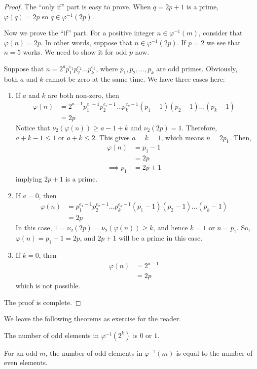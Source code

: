 	\begin{proof}
		The ``only if'' part is easy to prove. When $q=2p+1$ is a prime, $\varphi(q)=2p$ so $q\in\varphi^{-1}(2p)$.

		Now we prove the ``if'' part. For a positive integer $n\in\varphi^{-1}(m)$, consider that $\varphi(n)=2p$. In other words, suppose that $n \in\varphi^{-1}(2p)$.  If $p=2$ we see that $n=5$ works. We need to show it for odd $p$ now.

		Suppose that $n= 2^a p_1^{e_1}p_2^{e_2}\dots p_k^{e_k}$, where $p_1, p_2, \dots, p_k$ are odd primes. Obviously, both $a$ and $k$ cannot be zero at the same time. We have three cases here:

			\begin{enumerate}
				\item If $a$ and $k$ are both non-zero, then
					\begin{align*}
						\varphi(n) &= 2^{a-1} p_1^{e_1-1}p_2^{e_2-1}\dots p_k^{e_k-1} (p_1-1)(p_2-1)\dots (p_k-1)\\
					   &= 2p
					\end{align*}
				Notice that $\nu_2(\varphi(n)) \geq a-1+k$ and $\nu_2(2p)=1$. Therefore, $a+k-1 \leq 1$ or $a+k \leq 2$. This gives $a=k=1$, which means $n=2p_1$. Then,
					\begin{align*}
						\varphi(n)   &= p_1-1\\
					     &= 2p\\
						\implies p_1 &= 2p+1
					\end{align*}
				implying $2p+1$ is a prime.

				\item If $a=0$, then
					\begin{align*}
						\varphi(n) &= p_1^{e_1-1}p_2^{e_2-1}\dots p_k^{e_k-1} (p_1-1)(p_2-1)\dots (p_k-1)\\
					   &= 2p
					\end{align*}
				In this case, $1 = \nu_2(2p) = \nu_2(\varphi(n)) \geq k$, and hence $k=1$ or $n=p_1$. So, $\varphi(n)=p_1-1=2p$, and $2p+1$ will be a prime in this case.

				\item If $k=0$, then
					\begin{align*}
						\varphi(n) &= 2^{a-1}\\
					   &= 2p
					\end{align*}
				which is not possible.
			\end{enumerate}
		The proof is complete.
	\end{proof}

We leave the following theorems as exercise for the reader.
	\begin{theorem}
		The number of odd elements in $\varphi^{-1}(2^k)$ is $0$ or $1$.
	\end{theorem}

	\begin{theorem}
		For an odd $m$, the number of odd elements in $\varphi^{-1}(m)$ is equal to the number of even elements.
	\end{theorem}
